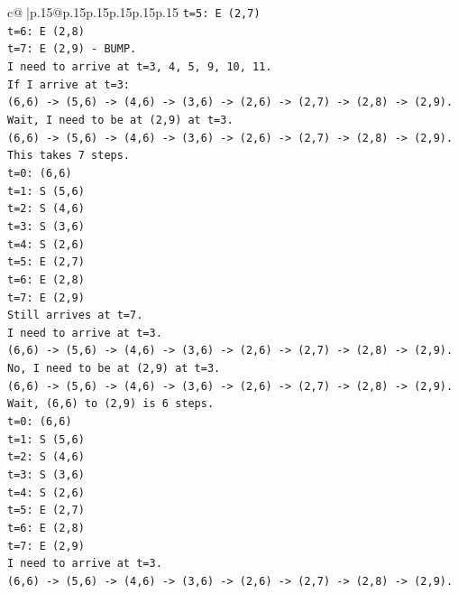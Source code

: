 \documentclass{article}
\begin{document}
{\begin{supertabular}{c@{$\;$}|p{.15\linewidth}@{}p{.15\linewidth}p{.15\linewidth}p{.15\linewidth}p{.15\linewidth}p{.15\linewidth}}
{{{\texttt{t=5: E (2,7)} \\
\texttt{t=6: E (2,8)} \\
\texttt{t=7: E (2,9) {-} BUMP.} \\
\texttt{I need to arrive at t=3, 4, 5, 9, 10, 11.} \\
\texttt{If I arrive at t=3:} \\
\texttt{(6,6) {-}> (5,6) {-}> (4,6) {-}> (3,6) {-}> (2,6) {-}> (2,7) {-}> (2,8) {-}> (2,9).} \\
\texttt{Wait, I need to be at (2,9) at t=3.} \\
\texttt{(6,6) {-}> (5,6) {-}> (4,6) {-}> (3,6) {-}> (2,6) {-}> (2,7) {-}> (2,8) {-}> (2,9).} \\
\texttt{This takes 7 steps.} \\
\texttt{t=0: (6,6)} \\
\texttt{t=1: S (5,6)} \\
\texttt{t=2: S (4,6)} \\
\texttt{t=3: S (3,6)} \\
\texttt{t=4: S (2,6)} \\
\texttt{t=5: E (2,7)} \\
\texttt{t=6: E (2,8)} \\
\texttt{t=7: E (2,9)} \\
\texttt{Still arrives at t=7.} \\
\texttt{I need to arrive at t=3.} \\
\texttt{(6,6) {-}> (5,6) {-}> (4,6) {-}> (3,6) {-}> (2,6) {-}> (2,7) {-}> (2,8) {-}> (2,9).} \\
\texttt{No, I need to be at (2,9) at t=3.} \\
\texttt{(6,6) {-}> (5,6) {-}> (4,6) {-}> (3,6) {-}> (2,6) {-}> (2,7) {-}> (2,8) {-}> (2,9).} \\
\texttt{Wait, (6,6) to (2,9) is 6 steps.} \\
\texttt{t=0: (6,6)} \\
\texttt{t=1: S (5,6)} \\
\texttt{t=2: S (4,6)} \\
\texttt{t=3: S (3,6)} \\
\texttt{t=4: S (2,6)} \\
\texttt{t=5: E (2,7)} \\
\texttt{t=6: E (2,8)} \\
\texttt{t=7: E (2,9)} \\
\texttt{I need to arrive at t=3.} \\
\texttt{(6,6) {-}> (5,6) {-}> (4,6) {-}> (3,6) {-}> (2,6) {-}> (2,7) {-}> (2,8) {-}> (2,9).} \\
}}}
\end{supertabular}}
\end{document}

